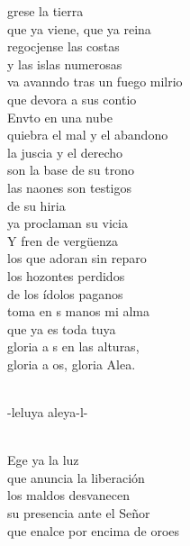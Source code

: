 \begin{cancion}%
	grese la tierra  \\
que ya viene, que ya reina\\
	regocjense las costas \\
y las islas numerosas\\
	va avanndo tras un fuego milrio\\
	que devora a sus contio\\
	Envto en una nube \\
quiebra el mal y el abandono\\
	la juscia y el derecho \\
son la base de su trono\\
	las naones son testigos \\
	de su hiria\\
	ya proclaman su vicia\\
	Y fren de vergüenza \\
los que adoran sin reparo\\
	los hozontes perdidos \\
de los ídolos paganos\\
	toma en s manos mi alma \\
	que ya es toda tuya\\
	gloria a s en las alturas, \\
	gloria a os, gloria Alea.\\\jump\\
	\begin{chorus}%
	-leluya aleya-l-\\
	\end{chorus}%
	\jump\\
	Ege ya la luz \\
que anuncia la liberación\\
	los maldos desvanecen \\
su presencia ante el Señor\\
	que enalce por encima de oroes\\

\end{cancion}

